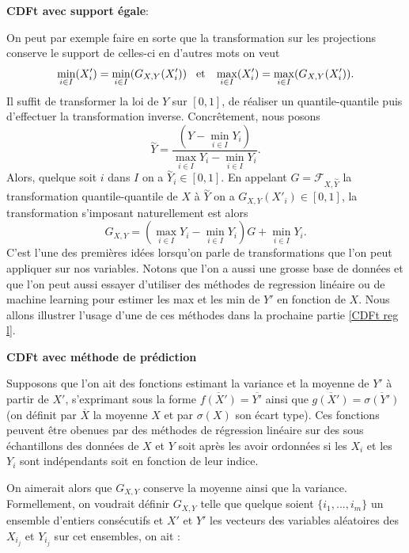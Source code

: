 \documentclass[a4paper,11pt]{article}
\numberwithin{equation}{section}
\begin{document}
\vspace{0.7cm}

\noindent \textbf{CDFt avec support égale}:

On peut par exemple faire en sorte que la transformation sur les projections conserve le support de celles-ci en d'autres mots on veut
\[ \min_{i \in I}(X'_i)=\min_{i \in I}(G_{X,Y}(X'_i)) \hspace{3mm} \textrm{et} \hspace{3mm}  \max_{i \in I}(X'_i)=\max_{i \in I}(G_{X,Y}(X'_i)).\]
Il suffit de transformer la loi de $Y$ sur $[0,1]$, de réaliser un quantile-quantile puis d'effectuer la transformation inverse. Concrêtement, nous posons 
\[\overset{\sim}{Y}= \frac{(Y-\min_{i\in I}Y_i)}{\max_{i\in I}Y_i- \min_{i\in I}Y_i}.\]
Alors, quelque soit $i$ dans $I$ on a $\overset{\sim}{Y}_i \in [0,1]$. En appelant $G= \mathcal{F}_{X,\overset{\sim}{Y}}$ la transformation quantile-quantile de $X$ à $\overset{\sim}{Y}$ on a $G_{X,Y}(X'_i) \in [0,1]$, la transformation s'imposant naturellement est alors
\[ G_{X,Y}= (\max_{i\in I}Y_i- \min_{i\in I}Y_i)G + \min_{i\in I}Y_i.\]
C'est l'une des premières idées lorsqu'on parle de transformations que l'on peut appliquer sur nos variables. Notons que l'on a aussi une grosse base de données et que l'on peut aussi essayer d'utiliser des méthodes de regression linéaire ou de machine learning pour estimer les max et les min de $Y'$ en fonction de $X$. Nous allons illustrer l'usage d'une de ces méthodes dans la prochaine partie \ref{CDFt reg l}.

\vspace{0.7cm}

\noindent \textbf{CDFt avec méthode de prédiction}
\label{CDFt reg l}

Supposons que l'on ait des fonctions estimant la variance et la moyenne de $Y'$ à partir de $X'$, s'exprimant sous la forme $\overline{f(X')} = \overline{Y'}$ ainsi que $\overline{g(X')} = \overline{\sigma(Y')}$ (on définit par $\overline{X}$ la  moyenne $X$ et par $\sigma(X)$ son écart type). Ces fonctions peuvent être obenues par des méthodes de régression linéaire sur des sous échantillons des données de $X$ et $Y$ soit après les avoir ordonnées si les $X_i$ et les $Y_i$ sont indépendants soit en fonction de leur indice.

On aimerait alors que $G_{X,Y}$ conserve la moyenne ainsi que la variance. Formellement, on voudrait définir $G_{X,Y}$ telle que quelque soient $\{i_1,...,i_m\}$ un ensemble d'entiers consécutifs et $X'$ et $Y'$ les vecteurs des variables aléatoires des $X_{i_j}$ et $Y_{i_j}$ sur cet ensembles, on ait :
\end{document}

